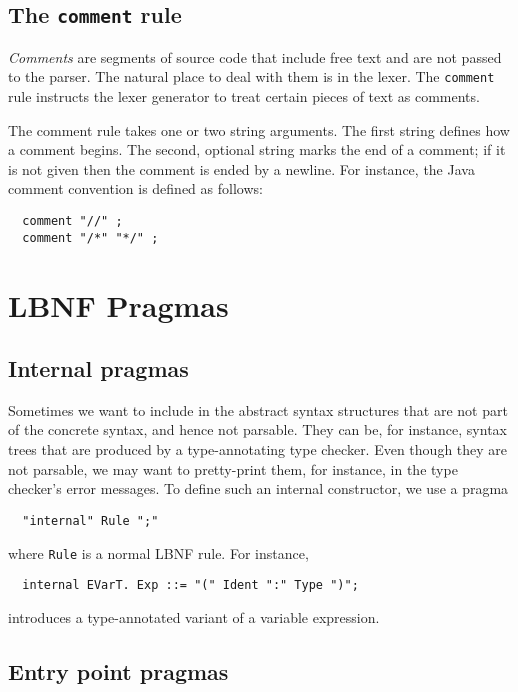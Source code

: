 \documentclass[10pt]{article}
\begin{document}
\subsection{The {\tt comment} rule}

\textit{Comments} are segments of source code that include free
text and are not passed to the parser. The natural place
to deal with them is in the lexer. The {\tt comment} rule instructs the
lexer generator to treat certain pieces of text as comments.

The comment rule takes one or two string arguments. The first
string defines how a comment begins.
The second, optional string marks the end of a comment;
if it is not given then the comment is ended by a newline.
For instance, the Java comment convention is defined as follows:
\begin{verbatim}
  comment "//" ;
  comment "/*" "*/" ;
\end{verbatim}


\section{LBNF Pragmas}
\label{pragmas}

\subsection{Internal pragmas}

Sometimes we want to include in the abstract syntax
structures that are not part of the concrete syntax,
and hence not parsable.
They can be, for instance, syntax trees that are produced by a
type-annotating type checker.
Even though they are not parsable, we may want to
pretty-print them, for instance, in the type checker's
error messages.
To define such an internal constructor, we use a pragma
\begin{verbatim}
  "internal" Rule ";"
\end{verbatim}
where {\tt Rule} is a normal LBNF rule. For instance,
\begin{verbatim}
  internal EVarT. Exp ::= "(" Ident ":" Type ")";
\end{verbatim}
introduces a type-annotated variant of a variable expression.



\subsection{Entry point pragmas}
\end{document}
